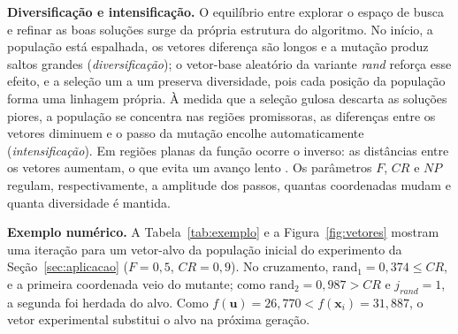 \documentclass[12pt]{article}
\newcommand{\x}{\mathbf{x}}
\newcommand{\uu}{\mathbf{u}}
\begin{document}
\textbf{Diversificação e intensificação.} O equilíbrio entre explorar o espaço
de busca e refinar as boas soluções surge da própria estrutura do algoritmo.
No início, a população está espalhada, os vetores diferença são longos e a
mutação produz saltos grandes (\emph{diversificação}); o vetor-base aleatório
da variante \emph{rand} reforça esse efeito, e a seleção um a um preserva
diversidade, pois cada posição da população forma uma linhagem própria. À
medida que a seleção gulosa descarta as soluções piores, a população se
concentra nas regiões promissoras, as diferenças entre os vetores diminuem e o
passo da mutação encolhe automaticamente (\emph{intensificação}). Em regiões
planas da função ocorre o inverso: as distâncias entre os vetores aumentam, o
que evita um avanço lento \cite{storn1997}. Os parâmetros $F$, $CR$ e $NP$
regulam, respectivamente, a amplitude dos passos, quantas coordenadas mudam e
quanta diversidade é mantida.

\textbf{Exemplo numérico.} A Tabela~\ref{tab:exemplo} e a
Figura~\ref{fig:vetores} mostram uma iteração para um vetor-alvo da população
inicial do experimento da Seção~\ref{sec:aplicacao} ($F = 0{,}5$,
$CR = 0{,}9$). No cruzamento, $\mathrm{rand}_1 = 0{,}374 \le CR$, e a primeira
coordenada veio do mutante; como $\mathrm{rand}_2 = 0{,}987 > CR$ e
$j_{rand} = 1$, a segunda foi herdada do alvo. Como
$f(\uu) = 26{,}770 < f(\x_i) = 31{,}887$, o vetor experimental substitui o alvo
na próxima geração.
\end{document}
